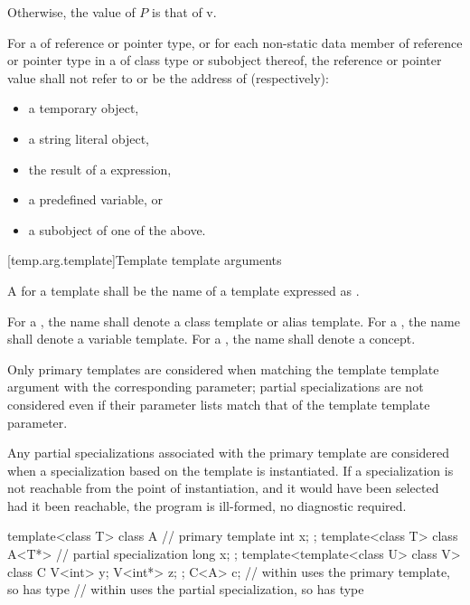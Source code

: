 \documentclass{wg21}
\begin{document}
\pnum
Otherwise, the value of $P$ is that of v.

\pnum
For a   of reference or pointer type,
or for each non-static data member of reference or pointer type
in a   of class type or subobject thereof,
the reference or pointer value shall not refer to
or be the address of (respectively):
\begin{itemize}
    \item a temporary object,
    \item a string literal object,
    \item the result of a  expression,
    \item a predefined  variable, or
    \item a subobject of one of the above.
\end{itemize}


[temp.arg.template]{Template template arguments}

\pnum A
for a template
shall be the name of a  template  expressed as
.

\begin{addedblock}
For a , the name shall denote a class template or alias template. For a , the name shall denote a variable template. For a , the name shall denote a concept.
\end{addedblock}

Only primary templates are considered when matching the template template
argument with the corresponding parameter; partial specializations are not
considered even if their parameter lists match that of the template template
parameter.

\pnum
Any partial specializations  associated with the
primary template are considered when a
specialization based on the template
is instantiated.
If a specialization is not reachable from the point of instantiation,
and it would have been selected had it been reachable, the program is ill-formed,
no diagnostic required.
\begin{example}
    \begin{codeblock}
        template<class T> class A {     // primary template
            int x;
        };
        template<class T> class A<T*> { // partial specialization
            long x;
        };
        template<template<class U> class V> class C {
            V<int>  y;
            V<int*> z;
        };
        C<A> c;             //  within  uses the primary template, so  has type 
        //  within  uses the partial specialization, so  has type 
    \end{codeblock}
\end{example}
\end{document}
